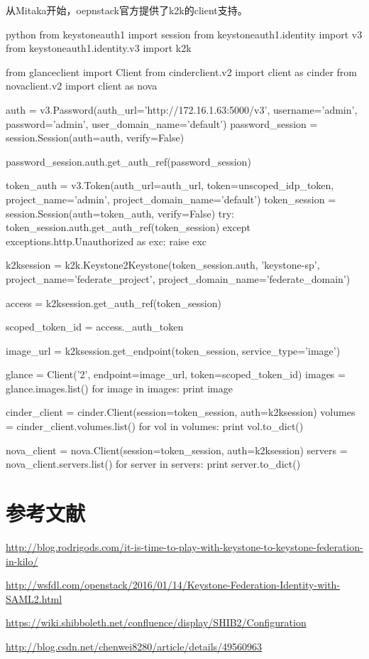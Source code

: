 从Mitaka开始，oepnstack官方提供了k2k的client支持。
\begin{code-block}{python}
from keystoneauth1 import session
from keystoneauth1.identity import v3
from keystoneauth1.identity.v3 import k2k

from glanceclient import Client
from cinderclient.v2 import client as cinder
from novaclient.v2 import client as nova

auth = v3.Password(auth_url='http://172.16.1.63:5000/v3',
                   username='admin',
                   password='admin',
                   user_domain_name='default')
password_session = session.Session(auth=auth, verify=False)

password_session.auth.get_auth_ref(password_session)

token_auth = v3.Token(auth_url=auth_url, token=unscoped_idp_token,
                      project_name='admin',
                      project_domain_name='default')
token_session = session.Session(auth=token_auth, verify=False)
try:
    token_session.auth.get_auth_ref(token_session)
except exceptions.http.Unauthorized as exc:
    raise exc

k2ksession = k2k.Keystone2Keystone(token_session.auth,
    'keystone-sp', project_name='federate_project',
    project_domain_name='federate_domain')

access = k2ksession.get_auth_ref(token_session)

scoped_token_id = access._auth_token

image_url = k2ksession.get_endpoint(token_session,
                                    service_type='image')

glance = Client('2', endpoint=image_url, token=scoped_token_id)
images = glance.images.list()
for image in images:
    print image

cinder_client = cinder.Client(session=token_session, auth=k2ksession)
volumes = cinder_client.volumes.list()
for vol in volumes:
    print vol.to_dict()

nova_client = nova.Client(session=token_session, auth=k2ksession)
servers = nova_client.servers.list()
for server in servers:
    print server.to_dict()
\end{code-block}

\section{参考文献}
\url{http://blog.rodrigods.com/it-is-time-to-play-with-keystone-to-keystone-federation-in-kilo/}

\url{http://wsfdl.com/openstack/2016/01/14/Keystone-Federation-Identity-with-SAML2.html}

\url{https://wiki.shibboleth.net/confluence/display/SHIB2/Configuration}

\url{http://blog.csdn.net/chenwei8280/article/details/49560963}
